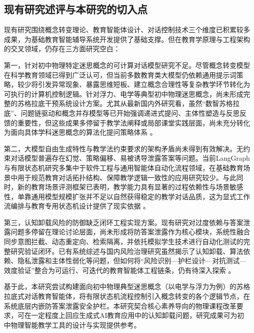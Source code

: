 \subsection{现有研究述评与本研究的切入点}

现有研究围绕概念转变理论、教育智能体设计、对话控制技术三个维度已积累较多成果，为基础教育智能辅导系统开发提供了基础支撑。但在教育学原理与工程架构的交叉领域，仍存在三方面研究空白：

第一，针对初中物理特定迷思概念的可计算对话模型研究不足。尽管概念转变模型在科学教育领域已得到广泛认可，但当前多数教育类大模型仍依赖通用提示词策略，较少将引发异常现象、暴露思维短板、建立概念合理性等复杂教学环节转化为可执行的计算机控制逻辑。针对浮力、电学等典型初中物理迷思概念，尚未形成完整的苏格拉底干预系统设计方案。尤其从最新国内外研究看，虽然“数智苏格拉底”、问题链驱动和概念并存模型等已开始强调递进式提问、主体性塑造与反思反馈的重要性，但这些成果多停留于教学法阐释或局部课堂实践层面，尚未充分转化为面向具体学科迷思概念的算法化提问策略体系 \citep{zhao2024isocratic,fan2024coexistence,lizhengde2025misconception}。

第二，大模型自由生成特性与教学法约束要求的架构矛盾尚未得到有效解决。无约束对话模型普遍存在幻觉、策略偏移、易被诱导泄露答案等问题。当前LangGraph与有限状态机研究多集中于软件工程与通用智能体自动化流程领域，在基础教育场景中用于规范教育对话拓扑结构、保障教学逻辑一致性的应用研究较少。与此同时，新的教育场景评测框架已表明，教学能力具有显著的过程依赖性与场景敏感性，单靠通用模型规模扩张并不足以自然获得稳定的教学对话品质，这为显式工作流编排与教育专用状态机设计提供了现实依据 \citep{shi2025educationq,weib2025elmes}。

第三，认知卸载风险的防御缺乏闭环工程实现方案。现有研究对过度依赖与答案泄露问题多停留在理论讨论层面，尚未形成将防答案泄露作为核心模块，系统性融合同步意图拦截、动态重定向、检索隔离，并依托模拟学生技术进行自动化测试的完整研究验证闭环。已有系统综述与国内风险治理研究虽然揭示了认知卸载、算法依赖、隐私泄露和主体性弱化等问题，但如何将“风险识别—护栏设计—对抗测试—效度验证”整合为可运行、可迭代的教育智能体工程链条，仍有待深入探索 \citep{zhai2024overreliance,delikoura2025risks,zhanghaipeng2025toe}。

基于此，本研究尝试构建面向初中物理典型迷思概念（以电学与浮力为例）的苏格拉底式对话教育智能体，将有限状态机流程控制引入概念转变的各个逻辑节点，在系统底层内嵌防答案泄露安全护栏。本研究契合核心素养导向的物理课程改革要求，可在一定程度上回应生成式AI教育应用中的认知卸载问题，研究成果可为初中物理智能教学工具的设计与实现提供参考。